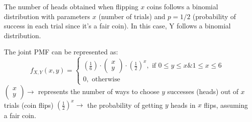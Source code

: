 \documentclass[a4paper,11pt]{article}
\theoremstyle{mytheor}
\begin{document}
The number of heads obtained when flipping $x$ coins follows a binomial distribution with parameters $x$ (number of trials) and $p=1 / 2$ (probability of success in each trial since it's a fair coin). In this case, Y follows a binomial distribution.

The joint PMF can be represented as:
$$
f_{X, Y}(x, y)=\left\{\begin{array}{l}
\left(\frac{1}{6}\right) \cdot\left(\begin{array}{l}
x \\
y
\end{array}\right) \cdot\left(\frac{1}{2}\right)^x, \text { if } 0 \leq y \leq x \& 1 \leq x \leq 6 \\
0, \text { otherwise }
\end{array}\right.
$$
$\left(\begin{array}{l}x \\ y\end{array}\right) \rightarrow$ represents the number of ways to choose $y$ successes (heads) out of $x$ trials (coin flips)
$\left(\frac{1}{2}\right)^x \rightarrow$ the probability of getting $y$ heads in $x$ flips, assuming a fair coin.

\newpage
\end{document}
